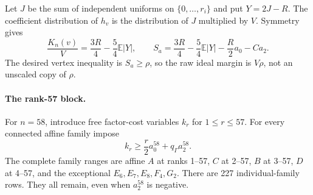 Let $J$ be the sum of independent uniforms on
$\{0,\ldots,r_i\}$ and put $Y=2J-R$. The coefficient distribution
of $h_v$ is the distribution of $J$ multiplied by $V$. Symmetry gives
\begin{equation}\label{fv:normalized-ideal}
 \frac{K_n(v)}V=\frac{3R}{4}-\frac54\mathbb E|Y|,
 \qquad
 S_a=\frac{3R}{4}-\frac54\mathbb E|Y|-\frac R2a_0-Ca_2.
\end{equation}
The desired vertex inequality is $S_a\ge\rho$, so the raw ideal
margin is $V\rho$, not an unscaled copy of $\rho$.

\paragraph{The rank-57 block.}
For $n=58$, introduce free factor-cost variables $k_r$ for
$1\le r\le57$. For every connected affine family impose
\begin{equation}\label{fv:ideal-factor-links}
                 k_r\ge\frac r2a^{58}_0+q_\Gamma a^{58}_2.
\end{equation}
The complete family ranges are affine $A$ at ranks 1--57,
$C$ at 2--57, $B$ at 3--57, $D$ at 4--57, and the exceptional
$E_6,E_7,E_8,F_4,G_2$. There are 227 individual-family rows.
They all remain, even when $a^{58}_2$ is negative.

